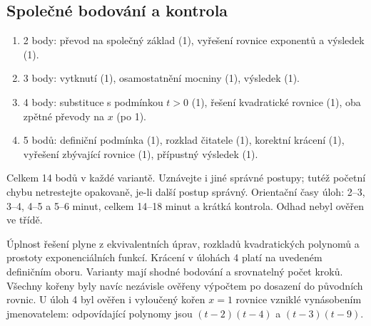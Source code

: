 \documentclass[a4paper,10pt]{article}
\begin{document}
\subsection*{Společné bodování a kontrola}
\begin{enumerate}
\item 2 body: převod na společný základ (1), vyřešení rovnice exponentů a výsledek (1).
\item 3 body: vytknutí (1), osamostatnění mocniny (1), výsledek (1).
\item 4 body: substituce s podmínkou $t>0$ (1), řešení kvadratické rovnice (1),
oba zpětné převody na $x$ (po 1).
\item 5 bodů: definiční podmínka (1), rozklad čitatele (1), korektní krácení (1),
vyřešení zbývající rovnice (1), přípustný výsledek (1).
\end{enumerate}
Celkem 14 bodů v každé variantě. Uznávejte i jiné správné postupy;
tutéž početní chybu netrestejte opakovaně, je-li další postup správný.
Orientační časy úloh: 2--3, 3--4, 4--5 a 5--6 minut,
celkem 14--18 minut a krátká kontrola. Odhad nebyl ověřen ve třídě.

Úplnost řešení plyne z ekvivalentních úprav, rozkladů kvadratických polynomů
a prostoty exponenciálních funkcí. Krácení v úlohách 4 platí na uvedeném
 definičním oboru. Varianty mají shodné bodování a srovnatelný počet kroků.
Všechny kořeny byly navíc nezávisle ověřeny výpočtem po dosazení do původních
rovnic. U úloh 4 byl ověřen i vyloučený kořen $x=1$ rovnice vzniklé
vynásobením jmenovatelem: odpovídající polynomy jsou $(t-2)(t-4)$
a $(t-3)(t-9)$.
\end{document}
